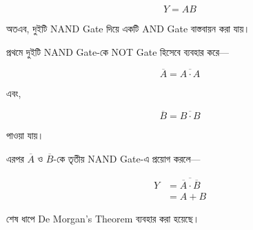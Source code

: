 \[
\boxed{Y=AB}
\]

অতএব, দুইটি \textenglish{NAND Gate} দিয়ে
একটি \textenglish{AND Gate} বাস্তবায়ন করা যায়।

\par\endgroup



\par\begingroup
{}


প্রথমে দুইটি \textenglish{NAND Gate}-কে
\textenglish{NOT Gate} হিসেবে ব্যবহার করে—

\[
\overline A=\overline{A\cdot A}
\]

এবং,

\[
\overline B=\overline{B\cdot B}
\]

পাওয়া যায়।

এরপর \(\overline A\) ও \(\overline B\)-কে
তৃতীয় \textenglish{NAND Gate}-এ প্রয়োগ করলে—

\[
\begin{aligned}
Y
&=\overline{\overline A\cdot\overline B}\\
&=A+B
\end{aligned}
\]

শেষ ধাপে \textenglish{De Morgan's Theorem} ব্যবহার করা হয়েছে।

